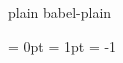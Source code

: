 \ifnocontextobject \donetrue \do \newif\ifdone \fi


\def\!!stringa{plain}       \ifx\!!stringa\fmtname \donetrue  \else
\def\!!stringa{babel-plain} \ifx\!!stringa\fmtname \donetrue  \else
                                                   \donefalse \fi \fi

\ifdone
  \newdimen\scratchdimen %
  \newdimen\scratchdimen %
  \newdimen\scratchdimen %
  \newdimen\scratchdimen %
  \newdimen\scratchdimen %
  \newdimen\scratchdimen %
\fi

\ifnocontextobject \scratchcounter \do \newcount  \scratchcounter \fi
\ifnocontextobject \scratchtoks    \do \newtoks   \scratchtoks    \fi
\ifnocontextobject \scratchdimen   \do \newdimen  \scratchdimen   \fi
\ifnocontextobject \scratchskip    \do \newskip   \scratchskip    \fi
\ifnocontextobject \scratchmuskip  \do \newmuskip \scratchmuskip  \fi
\ifnocontextobject \scratchbox     \do \newbox    \scratchbox     \fi
\ifnocontextobject \scratchread    \do \newread   \scratchread    \fi
\ifnocontextobject \scratchwrite   \do \newwrite  \scratchwrite   \fi

\ifnocontextobject \zeropoint      \do \newdimen  \zeropoint      \fi %
\ifnocontextobject \onepoint       \do \newdimen  \onepoint       \fi
\ifnocontextobject \zerocount      \do \chardef   {}   \fi
\ifnocontextobject \plusone        \do \chardef   {}   \fi
\ifnocontextobject \minusone       \do \newcount  \minusone       \fi

\ifnocontextobject \thousandpoint  \do \newdimen  \thousandpoint  \fi

\thousandpoint=1000pt
\zeropoint    =   0pt
\onepoint     =   1pt
\minusone     =  -1

\ifnocontextobject \emptytoks      \do \newtoks   \emptytoks      \fi

\ifnocontextobject \nextbox   \do \newbox   \nextbox   \fi
\ifnocontextobject \nextdepth \do \newdimen \nextdepth \fi

\ifnocontextobject \CONTEXTtrue            \do \newif\ifCONTEXT            \fi
\ifnocontextobject \eightbitcharacterstrue \do \newif\ifeightbitcharacters \fi
\ifnocontextobject \MPdrawingdonetrue      \do \newif\ifMPdrawingdone      \fi

\ifnocontextobject \ifzeropt               \do \let\ifzeropt\ifcase        \fi

